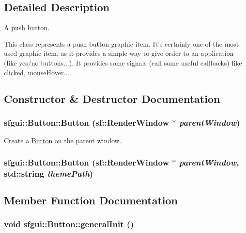 \subsection{Detailed Description}
A push button. 

This class represents a push button graphic item. It's certainly one of the most used graphic item, as it provides a simple way to give order to an application (like yes/no buttons...). It provides some signals (call some useful callbacks) like clicked, mouseHover... 

\subsection{Constructor \& Destructor Documentation}
\hypertarget{classsfgui_1_1Button_05c78461b775a073bed1e218586defd7}{
\subsubsection[Button]{\setlength{\rightskip}{0pt plus 5cm}sfgui::Button::Button (sf::RenderWindow $\ast$ {\em parentWindow})}}
\label{classsfgui_1_1Button_05c78461b775a073bed1e218586defd7}




Create a \hyperlink{classsfgui_1_1Button}{Button} on the parent window. \hypertarget{classsfgui_1_1Button_5189b70c8f868718f79c7e119e0b9b32}{
\subsubsection[Button]{\setlength{\rightskip}{0pt plus 5cm}sfgui::Button::Button (sf::RenderWindow $\ast$ {\em parentWindow}, \/  std::string {\em themePath})}}
\label{classsfgui_1_1Button_5189b70c8f868718f79c7e119e0b9b32}




\subsection{Member Function Documentation}
\hypertarget{classsfgui_1_1Button_59849e58ed4c46061d71f7172cab4e4e}{
\subsubsection[generalInit]{\setlength{\rightskip}{0pt plus 5cm}void sfgui::Button::generalInit ()}}
\label{classsfgui_1_1Button_59849e58ed4c46061d71f7172cab4e4e}




